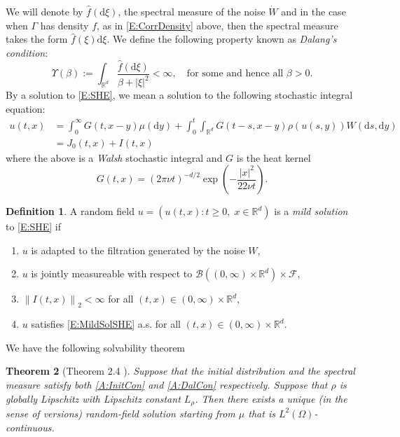 \documentclass[12pt]{report}
\theoremstyle{plain}
\newtheorem{theorem}{Theorem}[section]
\theoremstyle{definition}
\newtheorem{definition}[theorem]{Definition}
\numberwithin{equation}{section}
\newcommand{\R}{\mathbb{R}}
\newcommand{\Norm}[1]{\left\|  #1   \right\|}
\newcommand{\ud}{\ensuremath{ \mathrm{d} }}
\begin{document}
We will denote by $\hat{f}(\ud \xi)$, the spectral measure of the noise $\dot{W}$ and in the case when $\Gamma$ has density $f$, as in \eqref{E:CorrDensity} above, then the spectral measure takes the form $\hat{f}(\xi) \ud \xi$. We define the following property known as {\em Dalang's condition}:
	\begin{equation}\label{A:DalCon}
		\Upsilon(\beta) := \int_{\R^d} \frac{\hat{f}(\ud \xi)}{\beta + |\xi|^2} < \infty, \quad \text{for some and hence all } \beta > 0.
	\end{equation}
By a solution to \eqref{E:SHE}, we mean a solution to the following stochastic integral equation:
	\begin{align}
		u(t,x) &= \int_{0}^\infty G(t,x-y) \mu (\ud y) + \int_0^t\int_{\R^d} G(t-s, x-y) \rho(u(s,y)) W(\ud s, \ud y) \nonumber \\
		&= J_0(t,x) + I(t,x) \label{E:MildSolSHE}
	\end{align}
where the above is a {\em Walsh} stochastic integral \cite{walsh:86:introduction} and $G$ is the heat kernel 
	\[
		G(t,x) = (2\pi \nu t)^{-d/2} \exp\left(-\frac{|x|^2}{2 2 \nu t}\right).
	\]
\begin{definition}
	A random field $u = (u(t,x) : t \ge 0, \; x \in \R^d)$ is a {\em mild solution} to \eqref{E:SHE} if 
		\begin{enumerate}
			\item $u$ is adapted to the filtration generated by the noise $W$,
			\item $u$ is jointly measureable with respect to $\mathscr{B}((0,\infty) \times \R^d) \times \mathcal{F}$,
			\item $\Norm{I(t,x)}_2 < \infty$ for all $(t,x) \in (0,\infty) \times \R^d$,
			\item $u$ satisfies \eqref{E:MildSolSHE} a.s. for all $(t,x) \in (0,\infty) \times \R^d$.
		\end{enumerate}
\end{definition}

We have the following solvability theorem 

\begin{theorem}[Theorem 2.4 \cite{chen.kim:19:nonlinear}] \label{T:SHEsolve}
	Suppose that the initial distribution and the spectral measure satisfy both \eqref{A:InitCon} and \eqref{A:DalCon} respectively. Suppose that $\rho$ is globally Lipschitz with Lipschitz constant $L_{\rho}$. Then there exists a unique (in the sense of versions) random-field solution starting from $\mu$ that is $L^2(\Omega)$-continuous. 
\end{theorem}
\end{document}
